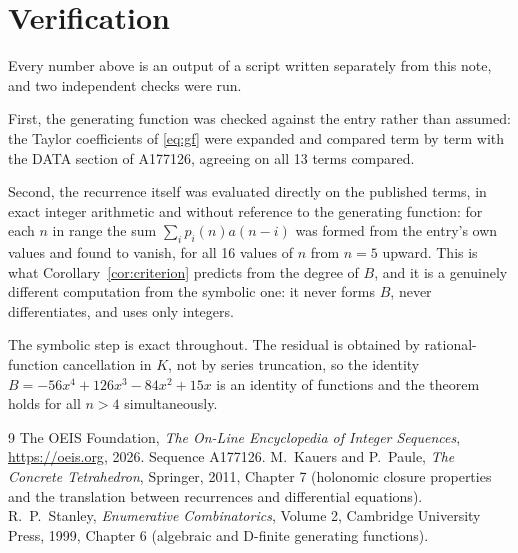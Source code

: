 \documentclass[11pt,a4paper]{article}
\theoremstyle{plain}
\theoremstyle{definition}
\begin{document}
\section{Verification}

Every number above is an output of a script written separately from this note, and two
independent checks were run.

First, the generating function was checked against the entry rather than assumed: the
Taylor coefficients of \eqref{eq:gf} were expanded and compared term by term with the DATA
section of A177126, agreeing on all 13 terms compared.

Second, the recurrence itself was evaluated directly on the published terms, in exact
integer arithmetic and without reference to the generating function: for each $n$ in range
the sum $\sum_{i}p_{i}(n)a(n-i)$ was formed from the entry's own values and found to
vanish, for all 16 values of $n$ from $n=5$ upward. This is what
Corollary~\ref{cor:criterion} predicts from the degree of $B$, and it is a genuinely
different computation from the symbolic one: it never forms $B$, never differentiates, and
uses only integers.

The symbolic step is exact throughout. The residual is obtained by rational-function
cancellation in $K$, not by series truncation, so the identity $B=- 56 x^{4} + 126 x^{3} - 84 x^{2} + 15 x$ is an
identity of functions and the theorem holds for all $n>4$ simultaneously.

\begin{thebibliography}{9}
 The OEIS Foundation, \emph{The On-Line Encyclopedia of Integer Sequences},
\url{https://oeis.org}, 2026. Sequence A177126.
 M.~Kauers and P.~Paule, \emph{The Concrete Tetrahedron}, Springer, 2011,
Chapter 7 (holonomic closure properties and the translation between recurrences and
differential equations).
 R.~P.~Stanley, \emph{Enumerative Combinatorics}, Volume 2, Cambridge
University Press, 1999, Chapter 6 (algebraic and D-finite generating functions).
\end{thebibliography}
\end{document}
